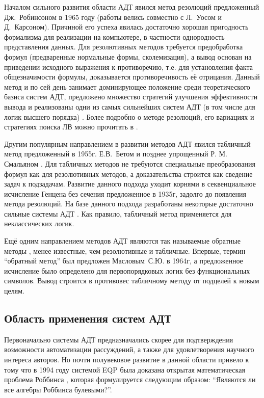Началом сильного развития области АДТ явился метод резолюций \cite{Robinson_1965} предложенный Дж.~Робинсоном в 1965 году (работы велись совместно с Л.~Уосом и Д.~Карсоном). Причиной его успеха явилась достаточно хорошая пригодность формализма для реализации на компьютере, в частности однородность представления данных. Для резолютивных методов требуется предобработка формул (предваренные нормальные формы, сколемизация), а вывод основан на приведении исходного выражения к противоречию, т.е. для установления факта общезначимости формулы, доказывается противоречивость её отрицания. Данный метод и по сей день занимает доминирующее положение среди теоретического базиса систем АДТ, предложено множество стратегий улучшения эффективности вывода и реализованы одни из самых сильнейших систем АДТ (в том числе для логик высшего порядка) \cite{otter, vprover, eprover, iprover, leoprover}. Более подробно о методе резолюций, его вариациях и стратегиях поиска ЛВ можно прочитать в \cite{HAR, ChenLi}.

Другим популярным направлением в развитии методов АДТ явился табличный метод \cite{tableau2} предложенный в 1955г. Е.В.~Бетом \cite{Beth1955} и позднее упрощенный Р. М. Смальяном \cite{Smullyan1995}. Для табличных методов не требуются специальные преобразования формул как для резолютивных методов, а доказательства строится как сведение задач к подзадачам.  Развитие данного подхода уходит корнями в секвенциальное исчисление Генцена без сечения \cite{gentzen1935} предложенное в 1935г, задолго до появления метода резолюций. На базе данного подхода разработаны некоторые достаточно сильные системы АДТ \cite{Isabelle, leancop}. Как правило, табличный метод применяется для неклассических логик.

Ещё одним направлением методов АДТ являются так называемые обратные методы \cite{inverse}, менее известные, чем резолютивные и табличные. Впервые, термин ``обратный метод'' был предложен Масловым~С.Ю. \cite{Maslov_1964} в 1964г, а предложенное исчисление было определено для первопорядковых логик без функциональных символов. Вывод строится в противовес табличному методу от подцелей к новым целям.


\subsection{Область применения систем АДТ}
Первоначально системы АДТ предназначались скорее для подтверждения возможности автоматизации рассуждений, а также для удовлетворения научного интереса авторов. Но почти полувековое развитие в данной области привело к тому что в 1994 году системой EQP была доказана открытая математическая проблема Роббинса \cite{McCuneRob}, которая формулируется следующим образом: ``Являются ли все алгебры Роббинса булевыми?''.

